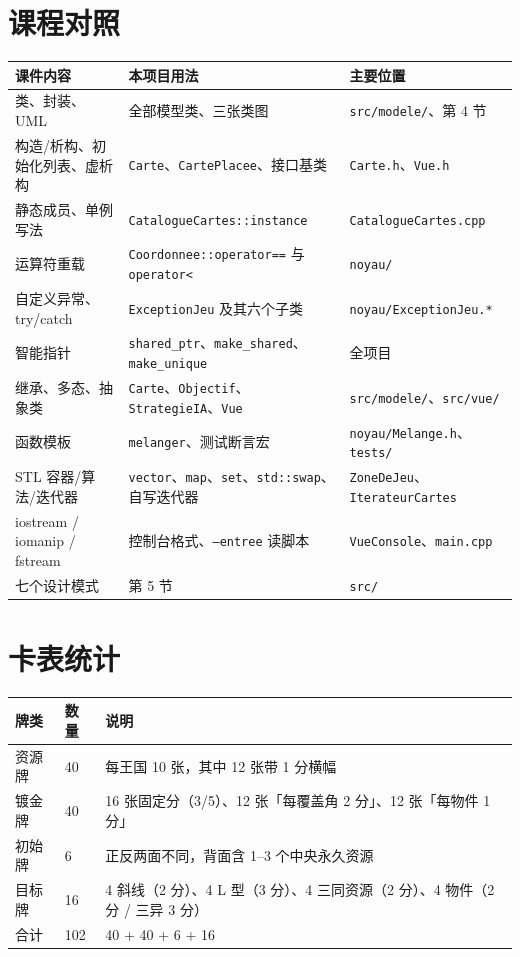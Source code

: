 \documentclass[11pt,a4paper]{ctexart}
\newcommand{\cl}[1]{\texttt{#1}}
\begin{document}
\section{课程对照}
\label{sec:portee}
\begin{longtable}{p{3.9cm}p{6.4cm}p{4.3cm}}
\toprule
课件内容 & 本项目用法 & 主要位置 \\
\midrule
类、封装、UML & 全部模型类、三张类图 & \cl{src/modele/}、第 4 节 \\
构造/析构、初始化列表、虚析构 & \cl{Carte}、\cl{CartePlacee}、接口基类 & \cl{Carte.h}、\cl{Vue.h} \\
静态成员、单例写法 & \cl{CatalogueCartes::instance} & \cl{CatalogueCartes.cpp} \\
运算符重载 & \cl{Coordonnee::operator==} 与 \cl{operator<} & \cl{noyau/} \\
自定义异常、try/catch & \cl{ExceptionJeu} 及其六个子类 & \cl{noyau/ExceptionJeu.*} \\
智能指针 & \cl{shared\_ptr}、\cl{make\_shared}、\cl{make\_unique} & 全项目 \\
继承、多态、抽象类 & \cl{Carte}、\cl{Objectif}、\cl{StrategieIA}、\cl{Vue} & \cl{src/modele/}、\cl{src/vue/} \\
函数模板 & \cl{melanger}、测试断言宏 & \cl{noyau/Melange.h}、\cl{tests/} \\
STL 容器/算法/迭代器 & \cl{vector}、\cl{map}、\cl{set}、\cl{std::swap}、自写迭代器 & \cl{ZoneDeJeu}、\cl{IterateurCartes} \\
iostream / iomanip / fstream & 控制台格式、\cl{--entree} 读脚本 & \cl{VueConsole}、\cl{main.cpp} \\
七个设计模式 & 第 5 节 & \cl{src/} \\
\bottomrule
\end{longtable}


\section{卡表统计}
\begin{longtable}{lll}
\toprule
牌类 & 数量 & 说明 \\
\midrule
资源牌 & 40 & 每王国 10 张，其中 12 张带 1 分横幅 \\
镀金牌 & 40 & 16 张固定分（3/5）、12 张「每覆盖角 2 分」、12 张「每物件 1 分」 \\
初始牌 & 6 & 正反两面不同，背面含 1--3 个中央永久资源 \\
目标牌 & 16 & 4 斜线（2 分）、4 L 型（3 分）、4 三同资源（2 分）、4 物件（2 分 / 三异 3 分） \\
\midrule
合计 & 102 & 40 + 40 + 6 + 16 \\
\bottomrule
\end{longtable}
\end{document}
